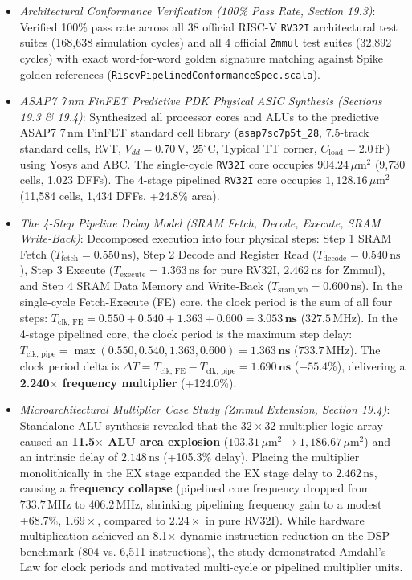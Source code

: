 \begin{itemize}
\begin{itemize}
        \item \textit{Architectural Conformance Verification (100\% Pass Rate, Section 19.3)}: Verified 100\% pass rate across all 38 official RISC-V \texttt{RV32I} architectural test suites (168,638 simulation cycles) and all 4 official \texttt{Zmmul} test suites (32,892 cycles) with exact word-for-word golden signature matching against Spike golden references (\texttt{RiscvPipelinedConformanceSpec.scala}).
        \item \textit{ASAP7 7\,nm FinFET Predictive PDK Physical ASIC Synthesis (Sections 19.3 \& 19.4)}: Synthesized all processor cores and ALUs to the predictive ASAP7 7\,nm FinFET standard cell library (\texttt{asap7sc7p5t\_28}, 7.5-track standard cells, RVT, $V_{dd} = 0.70\,\text{V}$, $25^\circ\text{C}$, Typical TT corner, $C_{\text{load}} = 2.0\,\text{fF}$) using Yosys and ABC.
        The single-cycle \texttt{RV32I} core occupies $904.24\,\mu\text{m}^2$ (9,730 cells, 1,023 DFFs).
        The 4-stage pipelined \texttt{RV32I} core occupies $1,128.16\,\mu\text{m}^2$ (11,584 cells, 1,434 DFFs, +24.8\% area).
        \item \textit{The 4-Step Pipeline Delay Model (SRAM Fetch, Decode, Execute, SRAM Write-Back)}: Decomposed execution into four physical steps: Step 1 SRAM Fetch ($T_{\text{fetch}} = 0.550\,\text{ns}$), Step 2 Decode and Register Read ($T_{\text{decode}} = 0.540\,\text{ns}$), Step 3 Execute ($T_{\text{execute}} = 1.363\,\text{ns}$ for pure RV32I, $2.462\,\text{ns}$ for Zmmul), and Step 4 SRAM Data Memory and Write-Back ($T_{\text{sram\_wb}} = 0.600\,\text{ns}$).
        In the single-cycle Fetch-Execute (FE) core, the clock period is the sum of all four steps: $T_{\text{clk, FE}} = 0.550 + 0.540 + 1.363 + 0.600 = \mathbf{3.053\,\text{ns}}$ ($327.5\,\text{MHz}$).
        In the 4-stage pipelined core, the clock period is the maximum step delay: $T_{\text{clk, pipe}} = \max(0.550, 0.540, 1.363, 0.600) = \mathbf{1.363\,\text{ns}}$ ($733.7\,\text{MHz}$).
        The clock period delta is $\Delta T = T_{\text{clk, FE}} - T_{\text{clk, pipe}} = \mathbf{1.690\,\text{ns}}$ ($-55.4\%$), delivering a \textbf{2.240$\times$ frequency multiplier} (+124.0\%).
        \item \textit{Microarchitectural Multiplier Case Study (Zmmul Extension, Section 19.4)}: Standalone ALU synthesis revealed that the $32 \times 32$ multiplier logic array caused an \textbf{11.5$\times$ ALU area explosion} ($103.31\,\mu\text{m}^2 \to 1,186.67\,\mu\text{m}^2$) and an intrinsic delay of $2.148\,\text{ns}$ (+105.3\% delay). Placing the multiplier monolithically in the EX stage expanded the EX stage delay to $2.462\,\text{ns}$, causing a \textbf{frequency collapse} (pipelined core frequency dropped from $733.7\,\text{MHz}$ to $406.2\,\text{MHz}$, shrinking pipelining frequency gain to a modest +68.7\%, $1.69\times$, compared to $2.24\times$ in pure RV32I). While hardware multiplication achieved an 8.1$\times$ dynamic instruction reduction on the DSP benchmark (804 vs. 6,511 instructions), the study demonstrated Amdahl's Law for clock periods and motivated multi-cycle or pipelined multiplier units.

\end{itemize}
\end{itemize}
